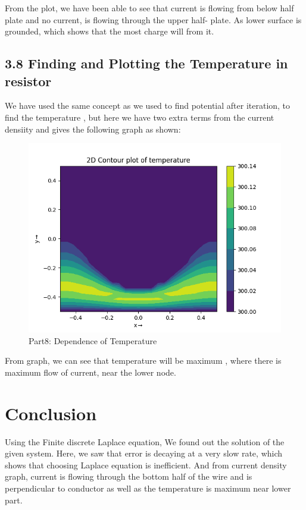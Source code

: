 \documentclass[12pt, a4paper]{report}
\begin{document}
  From the plot, we have been able to see that current is flowing from below half plate and no current, is flowing through the upper half- plate. As lower surface is grounded, which shows that the most charge will from it.
  
 \subsection*{3.8 Finding and Plotting the Temperature in resistor}
 We have used the same concept as we used to find potential after iteration, to find the temperature , but here we have two extra terms from the current densiity and gives the following graph as shown:
  \begin{figure}[H]
	\centering
	\includegraphics[scale=0.8]{Figure_12.png} 
	\caption{Part8: Dependence of Temperature}
	\label{fig:12}
  \end{figure}
  
  From graph, we can see that temperature will be maximum , where there is maximum flow of current, near the lower node.
  
  \section*{Conclusion}
  Using the Finite discrete Laplace equation, We found out the solution of the given system. Here, we saw that error is decaying at a very slow rate, which shows that choosing Laplace equation is inefficient. And from current density graph, current is flowing through the bottom half of the wire and is perpendicular to conductor as well as the temperature is maximum near lower part.
\end{document}
